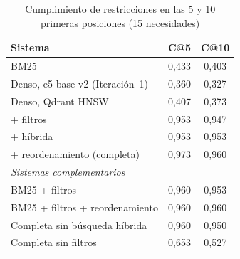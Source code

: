 \begin{table}[htbp!]
    \centering
    \caption{Cumplimiento de restricciones en las 5 y 10 primeras posiciones (15 necesidades)}
    \label{tab:res-restricciones}
    \begin{tabular}{|l|c|c|}
        \hline
        \textbf{Sistema} & \textbf{C@5} & \textbf{C@10} \\
        \hline
        BM25 & 0{,}433 & 0{,}403 \\
        \hline
        Denso, e5-base-v2 (Iteración~1) & 0{,}360 & 0{,}327 \\
        \hline
        Denso, Qdrant HNSW & 0{,}407 & 0{,}373 \\
        \hline
        + filtros & 0{,}953 & 0{,}947 \\
        \hline
        + híbrida & 0{,}953 & 0{,}953 \\
        \hline
        + reordenamiento (completa) & 0{,}973 & 0{,}960 \\
        \hline
        \multicolumn{3}{|l|}{\textit{Sistemas complementarios}} \\
        \hline
        BM25 + filtros & 0{,}960 & 0{,}953 \\
        \hline
        BM25 + filtros + reordenamiento & 0{,}960 & 0{,}960 \\
        \hline
        Completa sin búsqueda híbrida & 0{,}960 & 0{,}950 \\
        \hline
        Completa sin filtros & 0{,}653 & 0{,}527 \\
        \hline
    \end{tabular}
\end{table}
